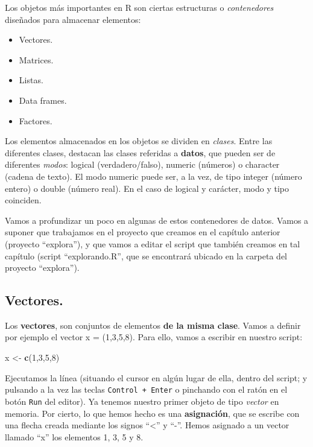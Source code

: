\documentclass[
]{book}
\newenvironment{Shaded}{\begin{snugshade}}{\end{snugshade}}
\newcommand{\DecValTok}[1]{\textcolor[rgb]{0.00,0.00,0.81}{#1}}
\newcommand{\FunctionTok}[1]{\textcolor[rgb]{0.13,0.29,0.53}{\textbf{#1}}}
\newcommand{\NormalTok}[1]{#1}
\newcommand{\OtherTok}[1]{\textcolor[rgb]{0.56,0.35,0.01}{#1}}
\begin{document}
Los objetos más importantes en R son ciertas estructuras o \emph{contenedores} diseñados para almacenar elementos:

\begin{itemize}
\item
  Vectores.
\item
  Matrices.
\item
  Listas.
\item
  Data frames.
\item
  Factores.
\end{itemize}

Los elementos almacenados en los objetos se dividen en \emph{clases}. Entre las diferentes clases, destacan las clases referidas a \textbf{datos}, que pueden ser de diferentes \emph{modos}: logical (verdadero/falso), numeric (números) o character (cadena de texto). El modo numeric puede ser, a la vez, de tipo integer (número entero) o double (número real). En el caso de logical y carácter, modo y tipo coinciden.

Vamos a profundizar un poco en algunas de estos contenedores de datos. Vamos a suponer que trabajamos en el proyecto que creamos en el capítulo anterior (proyecto ``explora''), y que vamos a editar el script que también creamos en tal capítulo (script ``explorando.R'', que se encontrará ubicado en la carpeta del proyecto ``explora'').

\subsection{Vectores.}\label{vectores.}

Los \textbf{vectores}, son conjuntos de elementos \textbf{de la misma clase}. Vamos a definir por ejemplo el vector x = (1,3,5,8). Para ello, vamos a escribir en nuestro script:

\begin{Shaded}
\begin{Highlighting}[]
\NormalTok{x }\OtherTok{\textless{}{-}} \FunctionTok{c}\NormalTok{(}\DecValTok{1}\NormalTok{,}\DecValTok{3}\NormalTok{,}\DecValTok{5}\NormalTok{,}\DecValTok{8}\NormalTok{)}
\end{Highlighting}
\end{Shaded}

Ejecutamos la línea (situando el cursor en algún lugar de ella, dentro del script; y pulsando a la vez las teclas \texttt{Control\ +\ Enter} o pinchando con el ratón en el botón \texttt{Run} del editor). Ya tenemos nuestro primer objeto de tipo \emph{vector} en memoria. Por cierto, lo que hemos hecho es una \textbf{asignación}, que se escribe con una flecha creada mediante los signos ``\textless{}'' y ``-''. Hemos asignado a un vector llamado ``x'' los elementos 1, 3, 5 y 8.
\end{document}
